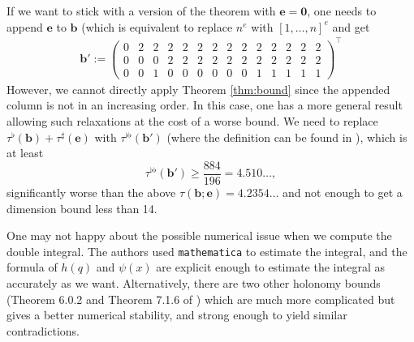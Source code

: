 \begin{remark*}
If we want to stick with a version of the theorem with $\mathbf{e} = \mathbf{0}$, one needs to append $\mathbf{e}$ to $\mathbf{b}$ (which is equivalent to replace $n^e$ with $[1, \dots, n]^e$ and get
\begin{align*}
    \mathbf{b}' := \begin{pmatrix}
        0 & 2 & 2 & 2 & 2 & 2 & 2 & 2 & 2 & 2 & 2 & 2 & 2 & 2 \\
        0 & 0 & 0 & 2 & 2 & 2 & 2 & 2 & 2 & 2 & 2 & 2 & 2 & 2 \\
        0 & 0 & 1 & 0 & 0 & 0 & 0 & 0 & 0 & 1 & 1 & 1 & 1 & 1
    \end{pmatrix}^\intercal 
\end{align*}
However, we cannot directly apply Theorem \ref{thm:bound} since the appended column is not in an increasing order.
In this case, one has a more general result \cite[Theorem 8.0.1]{calegari2024linear} allowing such relaxations at the cost of a worse bound.
We need to replace $\tau^\flat(\mathbf{b}) + \tau^\sharp(\mathbf{e})$ with $\tau^{\flat\flat}(\mathbf{b}')$ (where the definition can be found in \cite[Equation 8.0.2]{calegari2024linear}), which is at least
$$
    \tau^{\flat\flat}(\mathbf{b}') \ge \frac{884}{196} = 4.510\dots,
$$
significantly worse than the above $\tau(\mathbf{b};\mathbf{e}) = 4.2354\dots$ and not enough to get a dimension bound less than 14.
\end{remark*}

\begin{remark*}
One may not happy about the possible numerical issue when we compute the double integral.
The authors used \texttt{mathematica} to estimate the integral, and the formula of $h(q)$ and $\psi(x)$ are explicit enough to estimate the integral as accurately as we want.
Alternatively, there are two other holonomy bounds (Theorem 6.0.2 and Theorem 7.1.6 of \cite{calegari2024linear}) which are much more complicated but gives a better numerical stability, and strong enough to yield similar contradictions.
\end{remark*}